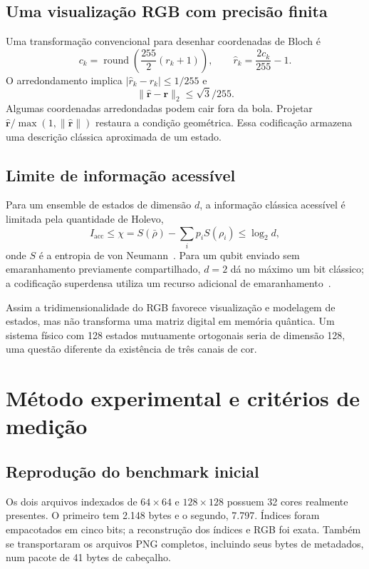 \documentclass[11pt,a4paper]{article}
\begin{document}
\subsection{Uma visualização RGB com precisão finita}
Uma transformação convencional para desenhar coordenadas de Bloch é
\begin{equation}
c_k=\operatorname{round}\!\left(\frac{255}{2}(r_k+1)\right),\qquad
\widehat r_k=\frac{2c_k}{255}-1.
\end{equation}
O arredondamento implica $|\widehat r_k-r_k|\le1/255$ e
\begin{equation}
\|\widehat{\mathbf r}-\mathbf r\|_2\le\sqrt3/255.
\end{equation}
Algumas coordenadas arredondadas podem cair fora da bola. Projetar $\widehat{\mathbf r}/\max(1,\|\widehat{\mathbf r}\|)$ restaura a condição geométrica. Essa codificação armazena uma descrição clássica aproximada de um estado.

\subsection{Limite de informação acessível}
Para um ensemble de estados de dimensão $d$, a informação clássica acessível é limitada pela quantidade de Holevo,
\begin{equation}
I_{\mathrm{acc}}\le\chi=S(\bar\rho)-\sum_ip_iS(\rho_i)\le\log_2d,
\end{equation}
onde $S$ é a entropia de von Neumann~\cite{1973holevoBounds}. Para um qubit enviado sem emaranhamento previamente compartilhado, $d=2$ dá no máximo um bit clássico; a codificação superdensa utiliza um recurso adicional de emaranhamento~\cite{ibmSuperdense}.

Assim a tridimensionalidade do RGB favorece visualização e modelagem de estados, mas não transforma uma matriz digital em memória quântica. Um sistema físico com 128 estados mutuamente ortogonais seria de dimensão 128, uma questão diferente da existência de três canais de cor.

\section{Método experimental e critérios de medição}
\subsection{Reprodução do benchmark inicial}
Os dois arquivos indexados de $64\times64$ e $128\times128$ possuem 32 cores realmente presentes. O primeiro tem 2.148 bytes e o segundo, 7.797. Índices foram empacotados em cinco bits; a reconstrução dos índices e RGB foi exata. Também se transportaram os arquivos PNG completos, incluindo seus bytes de metadados, num pacote de 41 bytes de cabeçalho.
\end{document}
